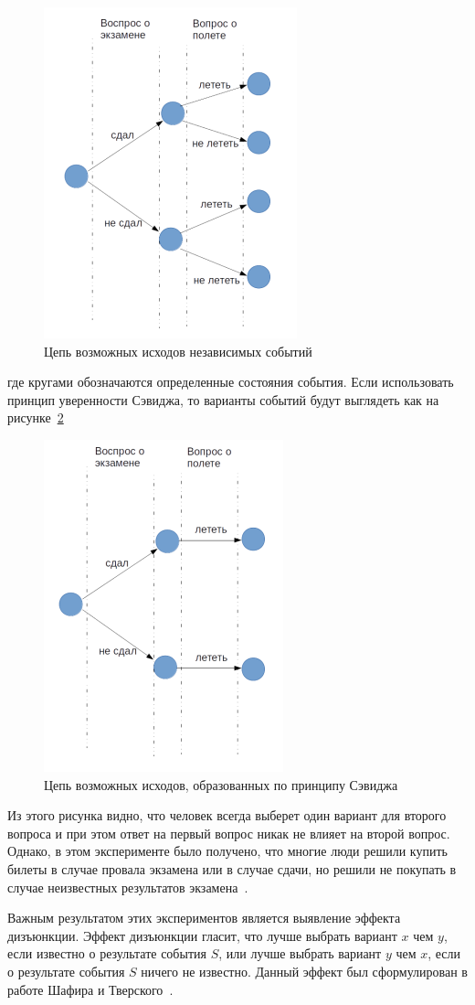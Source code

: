 \newpage
\begin{figure}[h!]
    \centering
    \captionsetup{justification=centering}
    \includegraphics[width=0.35\linewidth]{pictures/vacation_and_exam.png}
    \caption{Цепь возможных исходов независимых событий~\citep{shafir199228thinking}}
    \label{fig:vac_exam}
\end{figure}
где кругами обозначаются определенные состояния события. Если использовать принцип уверенности Сэвиджа,
то варианты событий будут выглядеть как на рисунке~\ref{fig:vac_exam_savage}

\begin{figure}[h!]
    \centering
    \captionsetup{justification=centering}
    \includegraphics[width=0.35\linewidth]{pictures/vacation_and_exam_2.png}
    \caption{Цепь возможных исходов, образованных по принципу Сэвиджа}
    \label{fig:vac_exam_savage}
\end{figure}
Из этого рисунка видно, что человек всегда выберет один вариант для второго вопроса и при этом ответ
на первый вопрос никак не влияет на второй вопрос. Однако, в этом эксперименте было получено, что
многие люди решили купить билеты в случае провала экзамена или в случае сдачи, но решили не покупать
в случае неизвестных результатов экзамена~\citep{tversky1992disjunction}.

Важным результатом этих экспериментов является выявление эффекта дизъюнкции. Эффект дизъюнкции гласит,
что лучше выбрать вариант $x$ чем $y$, если известно о результате события $S$, или лучше выбрать
вариант $y$ чем $x$, если о результате события $S$ ничего не известно. Данный эффект был сформулирован
в работе Шафира и Тверского~\citep{shafir199228thinking}.

